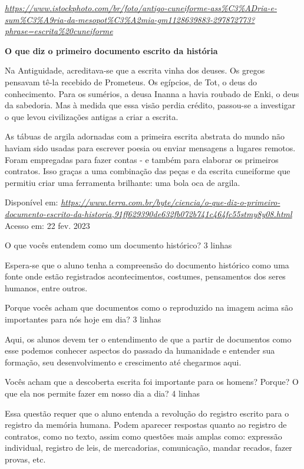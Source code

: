 \href{https://www.istockphoto.com/br/foto/antigo-cuneiforme-ass\%C3\%ADria-e-sum\%C3\%A9ria-da-mesopot\%C3\%A2mia-gm1128639883-297872773?phrase=escrita\%20cuneiforme}{\emph{https://www.istockphoto.com/br/foto/antigo-cuneiforme-ass\%C3\%ADria-e-sum\%C3\%A9ria-da-mesopot\%C3\%A2mia-gm1128639883-297872773?phrase=escrita\%20cuneiforme}}

\textbf{O que diz o primeiro documento escrito da história}

Na Antiguidade, acreditava-se que a escrita vinha dos deuses. Os gregos
pensavam tê-la recebido de Prometeus. Os egípcios, de Tot, o deus do
conhecimento. Para os sumérios, a deusa Inanna a havia roubado de Enki,
o deus da sabedoria. Mas à medida que essa visão perdia crédito,
passou-se a investigar o que levou civilizações antigas a criar a
escrita.

As tábuas de argila adornadas com a primeira escrita abstrata do mundo
não haviam sido usadas para escrever poesia ou enviar mensagens a
lugares remotos. Foram empregadas para fazer contas - e também para
elaborar os primeiros contratos. Isso graças a uma combinação das peças
e da escrita cuneiforme que permitiu criar uma ferramenta brilhante: uma
bola oca de argila.

Disponível em:
\href{https://www.terra.com.br/byte/ciencia/o-que-diz-o-primeiro-documento-escrito-da-historia,91ff629390de632fb072b741c464fc55stmy8y08.html}{\emph{https://www.terra.com.br/byte/ciencia/o-que-diz-o-primeiro-documento-escrito-da-historia,91ff629390de632fb072b741c464fc55stmy8y08.html}}
Acesso em: 22 fev. 2023

O que vocês entendem como um documento histórico? 3 linhas

Espera-se que o aluno tenha a compreensão do documento histórico como
uma fonte onde estão registrados acontecimentos, costumes, pensamentos
dos seres humanos, entre outros.

Porque vocês acham que documentos como o reproduzido na imagem acima são
importantes para nós hoje em dia? 3 linhas

Aqui, os alunos devem ter o entendimento de que a partir de documentos
como esse podemos conhecer aspectos do passado da humanidade e entender
sua formação, seu desenvolvimento e crescimento até chegarmos aqui.

Vocês acham que a descoberta escrita foi importante para os homens?
Porque? O que ela nos permite fazer em nosso dia a dia? 4 linhas

Essa questão requer que o aluno entenda a revolução do registro escrito
para o registro da memória humana. Podem aparecer respostas quanto ao
registro de contratos, como no texto, assim como questões mais amplas
como: expressão individual, registro de leis, de mercadorias,
comunicação, mandar recados, fazer provas, etc.

